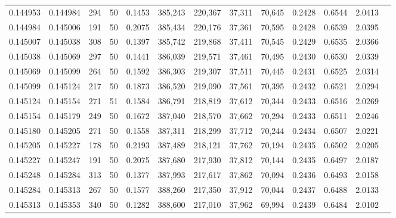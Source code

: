 \begin{tabular}{rrrrrrrrrrrrr}
0.144953 & 0.144984 &   294 &  50 &                                     0.1453 & 385,243 & 220,367 &  37,311 &  70,645 & 0.2428 & 0.6544 & 2.0413 \\
0.144984 & 0.145006 &   191 &  50 &                                     0.2075 & 385,434 & 220,176 &  37,361 &  70,595 & 0.2428 & 0.6539 & 2.0395 \\
0.145007 & 0.145038 &   308 &  50 &                                     0.1397 & 385,742 & 219,868 &  37,411 &  70,545 & 0.2429 & 0.6535 & 2.0366 \\
0.145038 & 0.145069 &   297 &  50 &                                     0.1441 & 386,039 & 219,571 &  37,461 &  70,495 & 0.2430 & 0.6530 & 2.0339 \\
0.145069 & 0.145099 &   264 &  50 &                                     0.1592 & 386,303 & 219,307 &  37,511 &  70,445 & 0.2431 & 0.6525 & 2.0314 \\
0.145099 & 0.145124 &   217 &  50 &                                     0.1873 & 386,520 & 219,090 &  37,561 &  70,395 & 0.2432 & 0.6521 & 2.0294 \\
0.145124 & 0.145154 &   271 &  51 &                                     0.1584 & 386,791 & 218,819 &  37,612 &  70,344 & 0.2433 & 0.6516 & 2.0269 \\
0.145154 & 0.145179 &   249 &  50 &                                     0.1672 & 387,040 & 218,570 &  37,662 &  70,294 & 0.2433 & 0.6511 & 2.0246 \\
0.145180 & 0.145205 &   271 &  50 &                                     0.1558 & 387,311 & 218,299 &  37,712 &  70,244 & 0.2434 & 0.6507 & 2.0221 \\
0.145205 & 0.145227 &   178 &  50 &                                     0.2193 & 387,489 & 218,121 &  37,762 &  70,194 & 0.2435 & 0.6502 & 2.0205 \\
0.145227 & 0.145247 &   191 &  50 &                                     0.2075 & 387,680 & 217,930 &  37,812 &  70,144 & 0.2435 & 0.6497 & 2.0187 \\
0.145248 & 0.145284 &   313 &  50 &                                     0.1377 & 387,993 & 217,617 &  37,862 &  70,094 & 0.2436 & 0.6493 & 2.0158 \\
0.145284 & 0.145313 &   267 &  50 &                                     0.1577 & 388,260 & 217,350 &  37,912 &  70,044 & 0.2437 & 0.6488 & 2.0133 \\
0.145313 & 0.145353 &   340 &  50 &                                     0.1282 & 388,600 & 217,010 &  37,962 &  69,994 & 0.2439 & 0.6484 & 2.0102 \\

\end{tabular}
